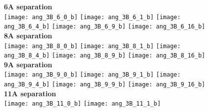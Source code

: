 \documentclass[journal=acsnano,manuscript=article]{achemso}
\begin{document}
	

\begin{figure}[h!]
	\centering
	\textbf{6A separation} \\
	\texttt{[image: ang\_3B\_6\_0\_b]} 
	\texttt{[image: ang\_3B\_6\_1\_b]}
	\texttt{[image: ang\_3B\_6\_4\_b]}
	\texttt{[image: ang\_3B\_6\_9\_b]}
	\texttt{[image: ang\_3B\_6\_16\_b]}
	\textbf{8A separation} \\
	\texttt{[image: ang\_3B\_8\_0\_b]} 
	\texttt{[image: ang\_3B\_8\_1\_b]}
	\texttt{[image: ang\_3B\_8\_4\_b]}
	\texttt{[image: ang\_3B\_8\_9\_b]}
	\texttt{[image: ang\_3B\_8\_16\_b]}
	\textbf{9A separation} \\
	\texttt{[image: ang\_3B\_9\_0\_b]} 
	\texttt{[image: ang\_3B\_9\_1\_b]}
	\texttt{[image: ang\_3B\_9\_4\_b]}
	\texttt{[image: ang\_3B\_9\_9\_b]}
	\texttt{[image: ang\_3B\_9\_16\_b]}
	\textbf{11A separation} \\
	\texttt{[image: ang\_3B\_11\_0\_b]} 
	\texttt{[image: ang\_3B\_11\_1\_b]}

\end{figure}
\end{document}
